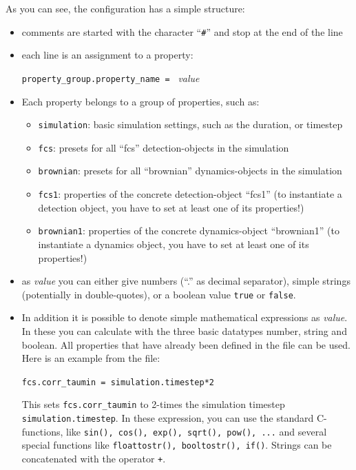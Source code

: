 \noindent As you can see, the configuration has a simple structure:
\begin{itemize}
  \item comments are started with the character ``\texttt{\#}'' and stop at the end of the line
	\item each line is an assignment to a property:
		\begin{center}
			\texttt{property\_group.property\_name = }	\textit{value}
		\end{center}
	\item Each property belongs to a group of properties, such as:
	\begin{itemize}
		\item \texttt{simulation}: basic simulation settings, such as the duration, or timestep
		\item \texttt{fcs}: presets for all ``fcs'' detection-objects in the simulation
		\item \texttt{brownian}: presets for all ``brownian'' dynamics-objects in the simulation
		\item \texttt{fcs1}: properties of the concrete detection-object ``fcs1'' (to instantiate a detection object, you have to set at least one of its properties!)
		\item \texttt{brownian1}: properties of the concrete dynamics-object ``brownian1'' (to instantiate a dynamics object, you have to set at least one of its properties!)
	\end{itemize}
	\item as \textit{value} you can either give numbers (``.'' as decimal separator), simple strings (potentially in double-quotes), or a boolean value \texttt{true} or \texttt{false}.
	\item In addition it is possible to denote simple mathematical expressions as \textit{value}. In these you can calculate with the three basic datatypes number, string and boolean. All properties that have already been defined in the file can be used. Here is an example from the file:
	\begin{center}
		\texttt{fcs.corr\_taumin = simulation.timestep*2}
	\end{center}
	This sets \texttt{fcs.corr\_taumin} to 2-times the simulation timestep \texttt{simulation.timestep}. In these expression, you can use the standard C-functions, like \texttt{sin(), cos(), exp(), sqrt(), pow(), ...} and several special functions like \texttt{floattostr(), booltostr(), if()}. Strings can be concatenated with the operator \texttt{+}.
\end{itemize}


